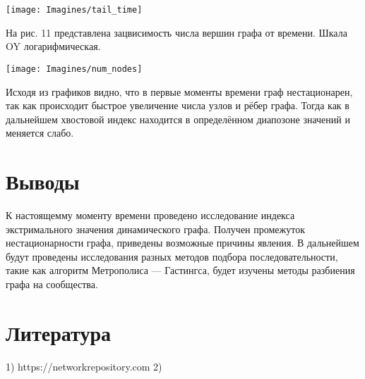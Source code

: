 \documentclass[reprint, amsmath, amssymb, aps,]{revtex4-2}
\begin{document}
\begin{center}
\centering 
\texttt{[image: Imagines/tail\_time]}
\end{center}

На рис. 11 представлена зацвисимость числа вершин графа от времени. Шкала OY логарифмическая.

\begin{center}
\centering 
\texttt{[image: Imagines/num\_nodes]}
\end{center}

Исходя из графиков видно, что в первые моменты времени граф нестационарен, так как происходит быстрое увеличение числа узлов и рёбер графа. Тогда как в дальнейшем хвостовой индекс находится в определённом диапозоне значений и меняется слабо.


\section{Выводы}
К настоящемму моменту времени проведено исследование индекса экстримального значения динамического графа. Получен промежуток нестационарности графа, приведены возможные причины явления. В дальнейшем будут проведены исследования разных методов подбора последовательности, такие как алгоритм Метрополиса — Гастингса, будет изучены методы разбиения графа на сообщества.   



\section{Литература}
1) https://networkrepository.com
2) 
\end{document}
